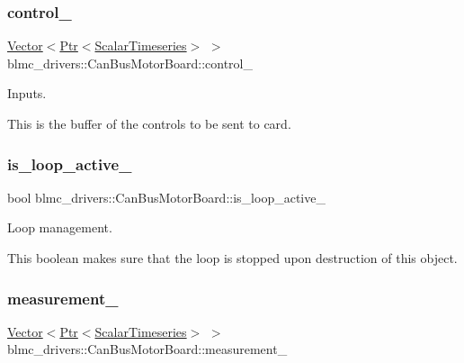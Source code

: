 \subsubsection{\texorpdfstring{control\+\_\+}{control\_}}
{\footnotesize\ttfamily \hyperlink{classblmc__drivers_1_1MotorBoardInterface_abeb474bef6d85dffcd5227e5ea965cc5}{Vector}$<$\hyperlink{classblmc__drivers_1_1MotorBoardInterface_a6a733b7ed7a3a96f6b0712b6bb5307f8}{Ptr}$<$\hyperlink{classblmc__drivers_1_1MotorBoardInterface_a14e237254ba495a66091ea3a3a33fa75}{Scalar\+Timeseries}$>$ $>$ blmc\+\_\+drivers\+::\+Can\+Bus\+Motor\+Board\+::control\+\_\+\hspace{0.3cm}{\ttfamily [private]}}



Inputs. 

This is the buffer of the controls to be sent to card. \mbox{\label{classblmc__drivers_1_1CanBusMotorBoard_ae25808cc09839c2574d134a36b5b4d5d}} 
\subsubsection{\texorpdfstring{is\+\_\+loop\+\_\+active\+\_\+}{is\_loop\_active\_}}
{\footnotesize\ttfamily bool blmc\+\_\+drivers\+::\+Can\+Bus\+Motor\+Board\+::is\+\_\+loop\+\_\+active\+\_\+\hspace{0.3cm}{\ttfamily [private]}}



Loop management. 

This boolean makes sure that the loop is stopped upon destruction of this object. \mbox{\label{classblmc__drivers_1_1CanBusMotorBoard_abbba6ad698905e56101c516baa795b29}} 
\subsubsection{\texorpdfstring{measurement\+\_\+}{measurement\_}}
{\footnotesize\ttfamily \hyperlink{classblmc__drivers_1_1MotorBoardInterface_abeb474bef6d85dffcd5227e5ea965cc5}{Vector}$<$\hyperlink{classblmc__drivers_1_1MotorBoardInterface_a6a733b7ed7a3a96f6b0712b6bb5307f8}{Ptr}$<$\hyperlink{classblmc__drivers_1_1MotorBoardInterface_a14e237254ba495a66091ea3a3a33fa75}{Scalar\+Timeseries}$>$ $>$ blmc\+\_\+drivers\+::\+Can\+Bus\+Motor\+Board\+::measurement\+\_\+\hspace{0.3cm}{\ttfamily [private]}}



